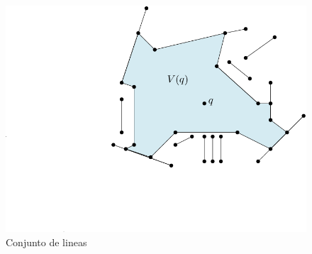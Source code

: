 \documentclass[aspectratio=169,xcolor=dvipsnames, t]{beamer}
\begin{document}
\begin{frame}
\begin{columns}[t]
    \begin{column}{0.33\textwidth}
      \begin{figure}
        \hspace*{-1.5cm}
        \centering
        \includegraphics[width=1.15\textwidth]{imagenes/Caso2.1c.png}
        \caption{Conjunto de lineas}
      \end{figure}
    \end{column}
  \end{columns}
\end{frame}
\end{document}
